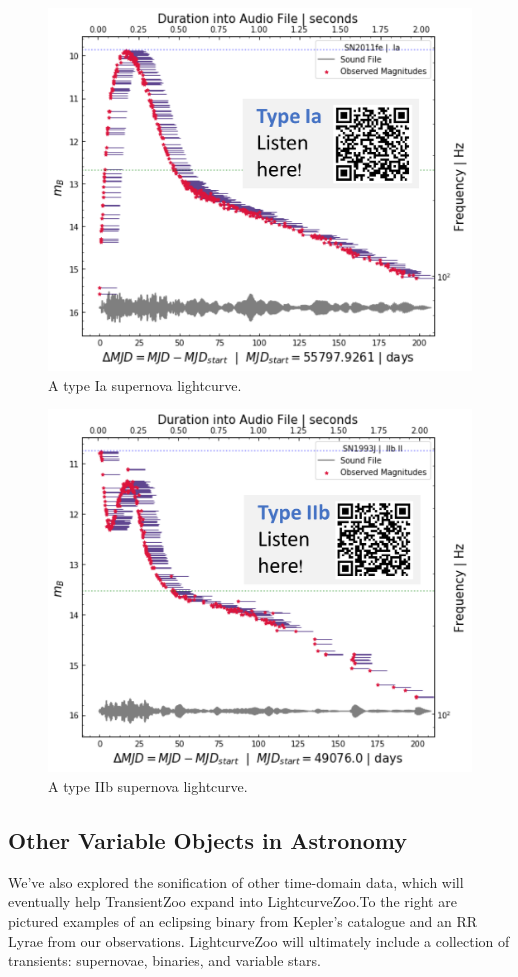 \documentclass[]{acmsiggraph}
\begin{document}
\begin{figure}[h]
\centering
\includegraphics[width=.7\linewidth]{paper/images/Ia.png}
\caption{A type Ia supernova lightcurve.}
\label{fig:Ia}
\end{figure}

\begin{figure}[h]
\centering
\includegraphics[width=.7\linewidth]{paper/images/IIb.png}
\caption{A type IIb supernova lightcurve.}
\label{fig:IIb}
\end{figure}

\subsection{Other Variable Objects in Astronomy}
We’ve also explored the sonification of other time-domain data, which will eventually help TransientZoo expand into LightcurveZoo.To the right are pictured examples of an eclipsing binary from Kepler’s catalogue and an RR Lyrae from our observations. LightcurveZoo will ultimately include a collection of transients: supernovae, binaries, and variable stars.


\end{document}
